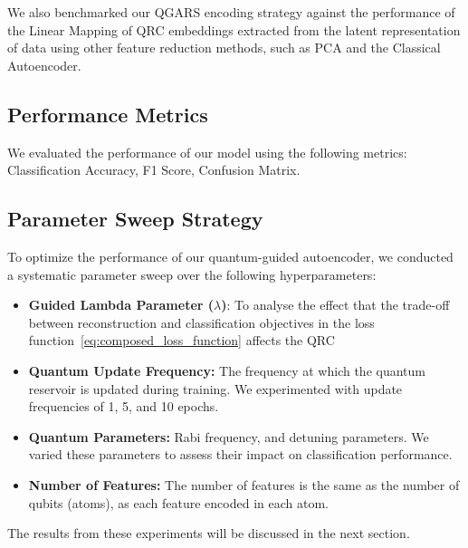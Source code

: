\documentclass[conference]{IEEEtran}
\begin{document}
We also benchmarked our QGARS encoding strategy
against the performance of the Linear Mapping of
QRC embeddings extracted from the latent representation 
of data using other feature reduction methods, such as
PCA and the Classical Autoencoder.

\subsection{Performance Metrics}
We evaluated the performance of our model using the following metrics:
Classification Accuracy, F1 Score, Confusion Matrix.

    
    
    


\subsection{Parameter Sweep Strategy}
To optimize the performance of our quantum-guided autoencoder, 
we conducted a systematic parameter sweep over the following hyperparameters:
\begin{itemize}
    \item \textbf{Guided Lambda Parameter (\( \lambda \))}: 
    To analyse the effect that the trade-off between reconstruction and classification objectives in the loss function~\ref{eq:composed_loss_function} affects
    the QRC
    
    \item \textbf{Quantum Update Frequency:} 
    The frequency at which the quantum reservoir is updated during training. We experimented with update frequencies of 1, 5, and 10 epochs.

    \item \textbf{Quantum Parameters:} 
    Rabi frequency, and detuning parameters. We varied these parameters to assess their impact on classification performance.

    \item \textbf{Number of Features:}
    The number of features is the same as the number of qubits (atoms), 
    as each feature encoded in each atom.
    
\end{itemize}
The results from these experiments will be discussed in the next section.
\end{document}
